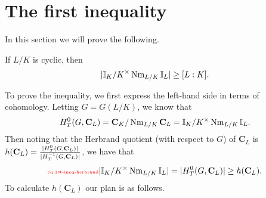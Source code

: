 \section{The first inequality}
In this section we will prove the following.
\begin{thm} 
If $L/K$ is cyclic, then
\[
|\mathbb{I}_K/K^{\times}\operatorname{Nm}_{L/K}\mathbb{I}_L|\ge [L:K].
\]
\end{thm}

To prove the inequality, we first express the left-hand side in terms of cohomology. Letting $G=G(L/K)$, we know that
\[
H_T^0(G,\mathbf C_L)=\mathbf C_K/\operatorname{Nm}_{L/K}\mathbf C_L = \mathbb{I}_K/K^{\times}\operatorname{Nm}_{L/K}\mathbb{I}_L.
\]
Then noting that the Herbrand quotient (with respect to $G$) of $\mathbf C_L$ is $h(\mathbf C_L)=\frac{|H_T^0(G,\mathbf C_L)|}{|H_T^{-1}(G,\mathbf C_L)|}$, we have that 
\begin{equation}\llabel{eq:1st-ineq-herbrand}
|\I_K/K^{\times}\nm_{L/K}\I_L|=|H_T^0(G,\mathbf C_L)|\ge
h(\mathbf C_L).
\end{equation}
To calculate $h(\mathbf C_L)$ our plan is as follows.
